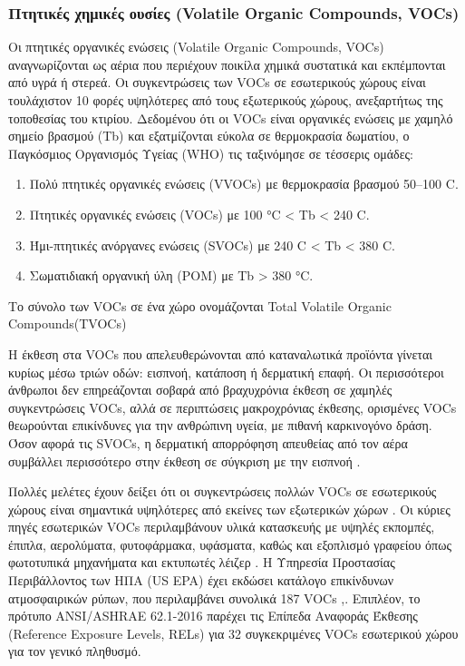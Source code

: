 \subsubsection{Πτητικές χημικές ουσίες (Volatile Organic Compounds, VOCs)}

Οι πτητικές οργανικές ενώσεις (Volatile Organic Compounds, VOCs) αναγνωρίζονται ως αέρια που περιέχουν ποικίλα χημικά συστατικά και εκπέμπονται από υγρά ή στερεά.
Οι συγκεντρώσεις των VOCs σε εσωτερικούς χώρους είναι τουλάχιστον 10 φορές υψηλότερες από τους εξωτερικούς χώρους, ανεξαρτήτως της τοποθεσίας του κτιρίου.
Δεδομένου ότι οι VOCs είναι οργανικές ενώσεις με χαμηλό σημείο βρασμού (Tb) και εξατμίζονται εύκολα σε θερμοκρασία δωματίου, ο Παγκόσμιος Οργανισμός Υγείας (WHO) τις ταξινόμησε σε τέσσερις ομάδες: 
\begin {enumerate}
    \item Πολύ πτητικές οργανικές ενώσεις (VVOCs) με θερμοκρασία βρασμού 50–100 \degree C.
    \item Πτητικές οργανικές ενώσεις (VOCs) με 100 °C < Tb < 240 \degree C.
    \item Ήμι-πτητικές ανόργανες ενώσεις (SVOCs) με 240 \degree C < Tb < 380 \degree C.
    \item Σωματιδιακή οργανική ύλη (POM) με Tb > 380 \degree °C.
\end{enumerate}

Το σύνολο των VOCs σε ένα χώρο ονομάζονται Total Volatile Organic Compounds(TVOCs)

Η έκθεση στα VOCs που απελευθερώνονται από καταναλωτικά προϊόντα γίνεται κυρίως μέσω τριών οδών: εισπνοή, κατάποση ή δερματική επαφή. 
Οι περισσότεροι άνθρωποι δεν επηρεάζονται σοβαρά από βραχυχρόνια έκθεση σε χαμηλές συγκεντρώσεις VOCs, αλλά σε περιπτώσεις μακροχρόνιας έκθεσης, ορισμένες VOCs θεωρούνται επικίνδυνες για την ανθρώπινη υγεία, 
με πιθανή καρκινογόνο δράση. 
Όσον αφορά τις SVOCs, η δερματική απορρόφηση απευθείας από τον αέρα συμβάλλει περισσότερο στην έκθεση σε σύγκριση με την εισπνοή \cite{ijerph17082927}.

Πολλές μελέτες έχουν δείξει ότι οι συγκεντρώσεις πολλών VOCs σε εσωτερικούς χώρους είναι σημαντικά υψηλότερες από εκείνες των εξωτερικών χώρων . Οι κύριες πηγές εσωτερικών VOCs περιλαμβάνουν υλικά κατασκευής με υψηλές εκπομπές, 
έπιπλα, αερολύματα, φυτοφάρμακα, υφάσματα, καθώς και εξοπλισμό γραφείου όπως φωτοτυπικά μηχανήματα και εκτυπωτές λέιζερ . 
Η Υπηρεσία Προστασίας Περιβάλλοντος των ΗΠΑ (US EPA) έχει εκδώσει κατάλογο επικίνδυνων ατμοσφαιρικών ρύπων, που περιλαμβάνει συνολικά 187 VOCs \cite{su12219045},\cite{USAEPA2025}. 
Επιπλέον, το πρότυπο ANSI/ASHRAE 62.1-2016 παρέχει τις Επίπεδα Αναφοράς Έκθεσης (Reference Exposure Levels, RELs) για 32 συγκεκριμένες VOCs εσωτερικού χώρου για τον γενικό πληθυσμό.

